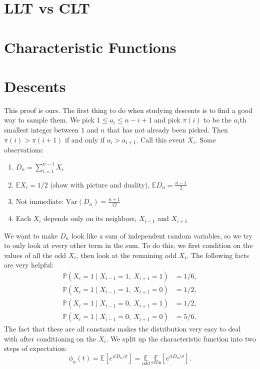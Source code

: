 \documentclass{article}
\newcommand{\f}[2]{\frac{#1}{#2}}
\newcommand{\E}{\mathbb{E}}
\renewcommand{\P}{\mathbb{P}}
\newcommand{\Var}{\mathrm{Var}}
\begin{document}
	\section*{LLT vs CLT}


	\section*{Characteristic Functions}


	\section*{Descents}

	This proof is ours. The first thing to do when studying descents is to find a good way to sample them. We pick $1 \leq a_i \leq n - i + 1$ and pick $\pi(i)$ to be the $a_i$th smallest integer between $1$ and $n$ that has not already been picked. Then $\pi(i) > \pi(i+1)$ if and only if $a_i > a_{i+1}$. Call this event $X_i$. Some observations:

	\begin{enumerate}[$\bullet$]
		\item
			$D_n = \sum\limits_{i=1}^{n-1} X_i$
		\item
			$\E X_i = 1/2$ (show with picture and duality), $\E D_n = \f{n-1}{2}$
		\item
			Not immediate: $\Var(D_n) = \f{n+1}{12}$
		\item
			Each $X_i$ depends only on its neighbors, $X_{i-1}$ and $X_{i+1}$
	\end{enumerate}

	We want to make $D_n$ look like a sum of independent random variables, so we try to only look at every other term in the sum. To do this, we first condition on the values of all the odd $X_i$, then look at the remaining odd $X_i$. The following facts are very helpful:
	\begin{align*}
		\P(X_i = 1 \mid X_{i-1} = 1,\ X_{i+1} = 1) &= 1/6, \\
		\P(X_i = 1 \mid X_{i-1} = 1,\ X_{i+1} = 0) &= 1/2, \\
		\P(X_i = 1 \mid X_{i-1} = 0,\ X_{i+1} = 1) &= 1/2, \\
		\P(X_i = 1 \mid X_{i-1} = 0,\ X_{i+1} = 0) &= 5/6.
	\end{align*}
	The fact that these are all constants makes the distribution very easy to deal with after conditioning on the $X_i$. We split up the characteristic function into two steps of expectation:
	\[ \phi_n(t) = \E[e^{itD_n/\sigma}] = \underset{\text{odd}}{\E} \ \underset{\text{even}}{\E} [e^{itD_n/\sigma}]. \]
\end{document}
